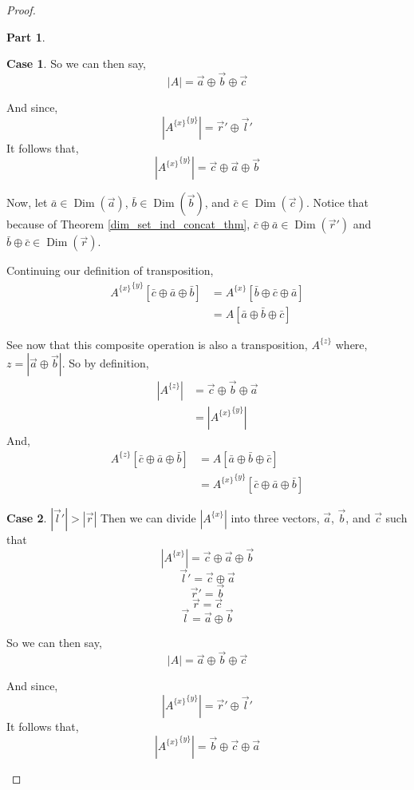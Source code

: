 \documentclass[12pt]{book}
\theoremstyle{plain}
\theoremstyle{definition}
\theoremstyle{ppart}
\newtheorem{ppart}{Part}
\theoremstyle{case}
\newtheorem{case}{Case}
\theoremstyle{solution}
\DeclareMathOperator{\Dim}{Dim}
\newcommand{\shape}[1]{\left|#1\right|}
\newcommand{\transpose}[2]{{#1}^{\{#2\}}}
\begin{document}
\begin{proof}
\begin{ppart}
\begin{case}
So we can then say,
\[ \shape{A} = \vec{a} \oplus \vec{b} \oplus \vec{c} \]

And since,
\[ \shape{\transpose{\transpose{A}{x}}{y}} = \vec{r}' \oplus \vec{l}' \]
It follows that,
\[ \shape{\transpose{\transpose{A}{x}}{y}} = \vec{c} \oplus \vec{a} \oplus \vec{b} \]

Now, let $\bar{a} \in \Dim(\vec{a})$, $\bar{b} \in \Dim(\vec{b})$, and
$\bar{c} \in \Dim(\vec{c})$. Notice that because of Theorem 
\ref{dim_set_ind_concat_thm}, $\bar{c} \oplus \bar{a} \in \Dim(\vec{r}')$ and
$\bar{b} \oplus \bar{c} \in \Dim(\vec{r})$.

Continuing our definition of transposition,
\begin{align*}
  \transpose{\transpose{A}{x}}{y}[\bar{c} \oplus \bar{a} \oplus \bar{b}]
  &=
  \transpose{A}{x}[\bar{b} \oplus \bar{c} \oplus \bar{a}] \\
  &=
  A[\bar{a} \oplus \bar{b} \oplus \bar{c}]
\end{align*}

See now that this composite operation is also a transposition, $\transpose{A}{z}$ where,
$z = \shape{\vec{a} \oplus \vec{b}}$.
So by definition,
\begin{align*}
  \shape{\transpose{A}{z}}
  &=
  \vec{c} \oplus \vec{b} \oplus \vec{a} \\
  &=
  \shape{\transpose{\transpose{A}{x}}{y}}  
\end{align*}
And,
\begin{align*}
  \transpose{A}{z}[\bar{c} \oplus \bar{a} \oplus \bar{b}]
  &=
  A[\bar{a} \oplus \bar{b} \oplus \bar{c}] \\
  &=
  \transpose{\transpose{A}{x}}{y}[\bar{c} \oplus \bar{a} \oplus \bar{b}]
\end{align*}
\end{case}

\begin{case} $\shape{\vec{l}'} > \shape{\vec{r}}$
Then we can divide $\shape{\transpose{A}{x}}$ into three vectors, $\vec{a}$, $\vec{b}$, and $\vec{c}$
such that
\[ \shape{\transpose{A}{x}} = \vec{c} \oplus \vec{a} \oplus \vec{b} \]
\[ \vec{l}' = \vec{c} \oplus \vec{a} \]
\[ \vec{r}' = \vec{b} \]
\[ \vec{r} = \vec{c} \]
\[ \vec{l} = \vec{a} \oplus \vec{b} \]

So we can then say,
\[ \shape{A} = \vec{a} \oplus \vec{b} \oplus \vec{c} \]

And since,
\[ \shape{\transpose{\transpose{A}{x}}{y}} = \vec{r}' \oplus \vec{l}' \]
It follows that,
\[ \shape{\transpose{\transpose{A}{x}}{y}} = \vec{b} \oplus \vec{c} \oplus \vec{a} \]


\end{case}
\end{ppart}
\end{proof}
\end{document}
